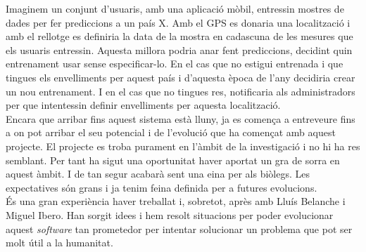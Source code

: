 Imaginem un conjunt d'usuaris, amb una aplicació mòbil, entressin mostres de dades per fer prediccions a un país X. Amb el GPS es donaria una localització i amb el rellotge es definiria la data de la mostra en cadascuna de les mesures que els usuaris entressin. Aquesta millora podria anar fent prediccions, decidint quin entrenament usar sense especificar-lo. En el cas que no estigui entrenada i que tingues els envelliments per aquest país i d'aquesta època de l'any decidiria crear un nou entrenament. I en el cas que no tingues res, notificaria als administradors per que intentessin definir envelliments per aquesta localització.\\

Encara que arribar fins aquest sistema est\`{a} lluny, ja es comença a entreveure fins a on pot arribar el seu potencial i de l'evolució que ha començat amb aquest projecte. El projecte es troba purament en l'àmbit de la investigació i no hi ha res semblant. Per tant ha sigut una oportunitat haver aportat un gra de sorra en aquest àmbit. I de tan segur acabar\`{a} sent una eina per als biòlegs. Les expectatives s\'{o}n grans i ja tenim feina definida per a futures evolucions.\\

\'{E}s una gran experiència haver treballat i, sobretot, apr\`{e}s amb Lluís Belanche i Miguel Ibero. Han sorgit idees i hem resolt situacions per poder evolucionar aquest \textit{software} tan prometedor per intentar solucionar un problema que pot ser molt útil a la humanitat.